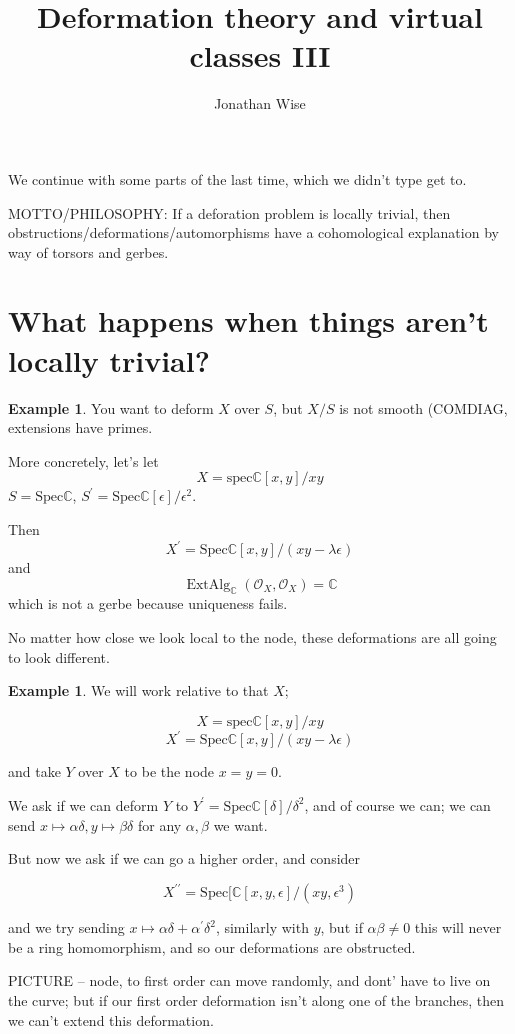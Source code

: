 \documentclass{amsart}
\author{Jonathan Wise}
\title{Deformation theory and virtual classes III}
\theoremstyle{definition}
\newtheorem{example}[dummy]{Example}
\DeclareMathOperator{\ExtAlg}{ExtAlg}
\newcommand{\Spec}{\text{Spec}}
\newcommand{\OO}{\mathcal{O}}
\newcommand{\C}{\mathbb{C}}
\begin{document}
\maketitle




We continue with some parts of the last time, which we didn't type get to.

MOTTO/PHILOSOPHY:
If a deforation problem is locally trivial, then obstructions/deformations/automorphisms have a cohomological explanation by way of torsors and gerbes.

\section{What happens when things aren't locally trivial?}

\begin{example}
You want to deform $X$ over $S$, but $X/S$ is not smooth (COMDIAG, extensions have primes.

More concretely, let's let
$$X=\text{spec} \C[x,y]/xy$$
$S=\text{Spec} \C$, $S^\prime=\Spec \C[\epsilon]/\epsilon^2$.

Then 
$$X^\prime=\Spec \C[x,y]/(xy-\lambda\epsilon)$$
and 
$$\ExtAlg_\C(\OO_X, \OO_X)=\C$$
which is not a gerbe because uniqueness fails.

No matter how close we look local to the node, these deformations are all going to look different.

\end{example}


\begin{example}
We will work relative to that $X$;


$$X=\text{spec} \C[x,y]/xy$$ 
$$X^\prime=\Spec \C[x,y]/(xy-\lambda\epsilon)$$

and take $Y$ over $X$ to be the node $x=y=0$.

We ask if we can deform $Y$ to $Y^\prime=\Spec\C[\delta]/\delta^2$, and of course we can; we can send $x\mapsto \alpha\delta, y\mapsto \beta\delta$ for any $\alpha, \beta$ we want.

But now we ask if we can go a higher order, and consider

$$X^{\prime\prime}=\Spec[\C[x,y,\epsilon]/(xy, \epsilon^3)$$

and we try sending $x\mapsto \alpha\delta+\alpha^\prime\delta^2$, similarly with $y$, but if $\alpha\beta\neq 0$ this will never be a ring homomorphism, and so our deformations are obstructed.

PICTURE -- node, to first order can move randomly, and dont' have to live on the curve; but if our first order deformation isn't along one of the branches, then we can't extend this deformation.
\end{example}
\end{document}
